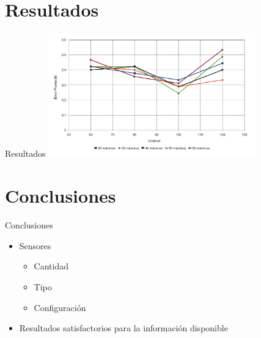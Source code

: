 \documentclass[spanish]{beamer}
\begin{document}
\section[Outline]{Resultados}

\begin{frame}{Resultados}
  \includegraphics[width=9cm]{../diagramas/estadistica_noche_iguales}
\end{frame}

\section[Outline]{Conclusiones}

\begin{frame}{Conclusiones}
  \begin{itemize}
  \item Sensores
    \begin{itemize}
    \item Cantidad
    \item Tipo
    \item Configuración
    \end{itemize}
  \item Resultados satisfactorios para la información disponible
  \end{itemize}
\end{frame}
\end{document}
